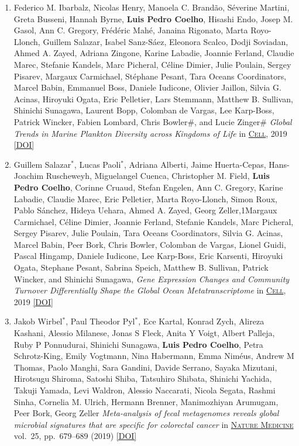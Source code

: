 \documentclass{article}
\newcommand\showdoi[1]{%
    \href{http://dx.doi.org/#1}{[DOI]}%
}
\newcommand\pubname[1]{\textsc{\uline{#1}}}
\newcommand\costar{${}^{*}$}
\begin{document}
\begin{enumerate}[resume]
\item Federico M. Ibarbalz, Nicolas Henry, Manoela C. Brandão, Séverine
Martini, Greta Busseni, Hannah Byrne, \textbf{Luis Pedro Coelho}, Hisashi Endo,
Josep M. Gasol, Ann C. Gregory, Frédéric Mahé, Janaina Rigonato, Marta
Royo-Llonch, Guillem Salazar, Isabel Sanz-Sáez, Eleonora Scalco, Dodji
Soviadan, Ahmed A. Zayed, Adriana Zingone, Karine Labadie, Joannie Ferland,
Claudie Marec, Stefanie Kandels, Marc Picheral, Céline Dimier, Julie Poulain,
Sergey Pisarev, Margaux Carmichael, Stéphane Pesant, Tara Oceans Coordinators,
Marcel Babin, Emmanuel Boss, Daniele Iudicone, Olivier Jaillon, Silvia G.
Acinas, Hiroyuki Ogata, Eric Pelletier, Lars Stemmann, Matthew B. Sullivan,
Shinichi Sunagawa, Laurent Bopp, Colomban de Vargas, Lee Karp-Boss, Patrick
Wincker, Fabien Lombard, Chris Bowler\#, and Lucie Zinger\# \emph{Global Trends
in Marine Plankton Diversity across Kingdoms of Life} in \pubname{Cell}, 2019
\showdoi{10.1016/j.cell.2019.10.008}

\item Guillem Salazar\costar, Lucas Paoli\costar, Adriana Alberti, Jaime
Huerta-Cepas, Hans-Joachim Ruscheweyh, Miguelangel Cuenca, Christopher M.
Field, \textbf{Luis Pedro Coelho}, Corinne Cruaud, Stefan Engelen, Ann C.
Gregory, Karine Labadie, Claudie Marec, Eric Pelletier, Marta Royo-Llonch,
Simon Roux, Pablo Sánchez, Hideya Uehara, Ahmed A. Zayed, Georg Zeller,1Margaux
Carmichael, Céline Dimier, Joannie Ferland, Stefanie Kandels, Marc Picheral,
Sergey Pisarev, Julie Poulain, Tara Oceans Coordinators, Silvia G. Acinas,
Marcel Babin, Peer Bork, Chris Bowler, Colomban de Vargas, Lionel Guidi, Pascal
Hingamp, Daniele Iudicone, Lee Karp-Boss, Eric Karsenti, Hiroyuki Ogata,
Stephane Pesant, Sabrina Speich, Matthew B. Sullivan, Patrick Wincker, and
Shinichi Sunagawa, \emph{Gene Expression Changes and Community Turnover
Differentially Shape the Global Ocean Metatranscriptome} in \pubname{Cell},
2019 \showdoi{10.1016/j.cell.2019.10.014}

\item Jakob Wirbel\costar, Paul Theodor Pyl\costar, Ece Kartal, Konrad Zych,
Alireza Kashani, Alessio Milanese, Jonas S Fleck, Anita Y Voigt, Albert
Palleja, Ruby P Ponnudurai, Shinichi Sunagawa, \textbf{Luis Pedro Coelho},
Petra Schrotz-King, Emily Vogtmann, Nina Habermann, Emma Niméus, Andrew M
Thomas, Paolo Manghi, Sara Gandini, Davide Serrano, Sayaka Mizutani, Hirotsugu
Shiroma, Satoshi Shiba, Tatsuhiro Shibata, Shinichi Yachida, Takuji Yamada,
Levi Waldron, Alessio Naccarati, Nicola Segata, Rashmi Sinha, Cornelia M.
Ulrich, Hermann Brenner, Manimozhiyan Arumugam, Peer Bork, Georg Zeller
\emph{Meta-analysis of fecal metagenomes reveals global microbial signatures
that are specific for colorectal cancer} in \pubname{Nature Medicine} vol.\ 25,
pp.\ 679–689 (2019) \showdoi{10.1038/s41591-019-0406-6}


\end{enumerate}
\end{document}
